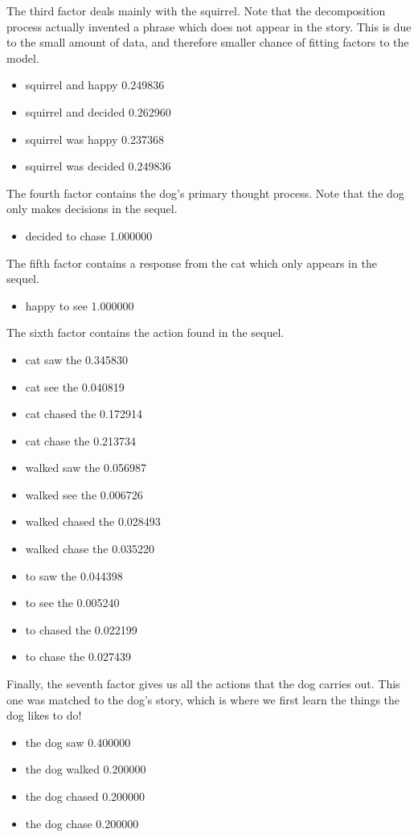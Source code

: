 \documentclass[../ut-dissertation.tex]{subfiles}
\begin{document}
The third factor deals mainly with the squirrel.  Note that the
decomposition process actually invented a phrase which does not appear
in the story.  This is due to the small amount of data, and therefore
smaller chance of fitting factors to the model.
\begin{itemize}
\item squirrel and happy 0.249836
\item squirrel and decided 0.262960
\item squirrel was happy 0.237368
\item squirrel was decided 0.249836
\end{itemize}

The fourth factor contains the dog's primary thought process.  Note
that the dog only makes decisions in the sequel.
\begin{itemize}
\item decided to chase 1.000000
\end{itemize}

The fifth factor contains a response from the cat which only appears
in the sequel.
\begin{itemize}
\item happy to see 1.000000
\end{itemize}

The sixth factor contains the action found in the sequel.
\begin{itemize}
\item cat saw the 0.345830
\item cat see the 0.040819
\item cat chased the 0.172914
\item cat chase the 0.213734
\item walked saw the 0.056987
\item walked see the 0.006726
\item walked chased the 0.028493
\item walked chase the 0.035220
\item to saw the 0.044398
\item to see the 0.005240
\item to chased the 0.022199
\item to chase the 0.027439
\end{itemize}

Finally, the seventh factor gives us all the actions that the dog
carries out.  This one was matched to the dog's story, which is where
we first learn the things the dog likes to do!
\begin{itemize}
\item  the dog saw 0.400000
\item the dog walked 0.200000
\item the dog chased 0.200000
\item the dog chase 0.200000
\end{itemize}
\end{document}
